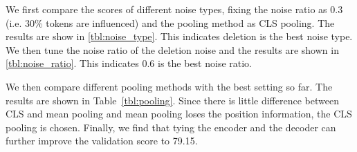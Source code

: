 \documentclass[11pt]{article}
\begin{document}
We first compare the scores of different noise types, fixing the noise ratio as 0.3 (i.e. 30\% tokens are influenced) and the pooling method as CLS pooling. The results are show in \autoref{tbl:noise_type}. This indicates deletion is the best noise type. We then tune the noise ratio of the deletion noise and the results are shown in \autoref{tbl:noise_ratio}. This indicates 0.6 is the best noise ratio. 

\begin{table}[H]
\centering
{}
\caption{Results with different noise types}
\label{tbl:noise_type}
\end{table}




\begin{table}[H]
\centering
{}
\caption{Results with different noise ratio.}
\label{tbl:noise_ratio}
\end{table}

We then compare different pooling methods with the best setting so far. The results are shown in Table~\ref{tbl:pooling}. Since there is little difference between CLS and mean pooling and mean pooling loses the position information, the CLS pooling is chosen. Finally, we find that tying the encoder and the decoder can further improve the validation score to 79.15.

\begin{table}[H]
\centering
{}
\caption{Results with different pooling methods.}
\label{tbl:pooling}
\end{table}
\end{document}
